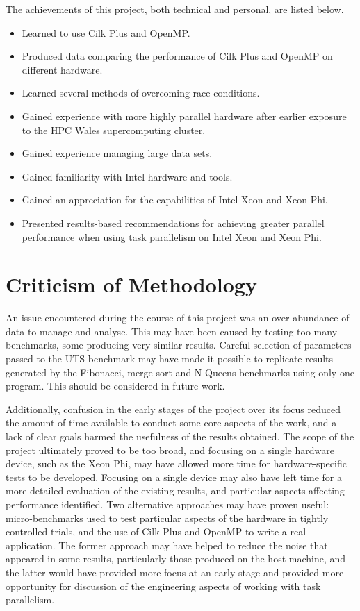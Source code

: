 \documentclass{report}
\begin{document}
The achievements of this project, both technical and personal, are listed below.
\begin{itemize}
	\item Learned to use Cilk Plus and OpenMP.
	\item Produced data comparing the performance of Cilk Plus and OpenMP on different hardware.
	\item Learned several methods of overcoming race conditions.
	\item Gained experience with more highly parallel hardware after earlier exposure to the HPC Wales supercomputing cluster.
	\item Gained experience managing large data sets.
	\item Gained familiarity with Intel hardware and tools.
	\item Gained an appreciation for the capabilities of Intel Xeon and Xeon Phi.
	\item Presented results-based recommendations for achieving greater parallel performance when using task parallelism on Intel Xeon and Xeon Phi.
\end{itemize}

\section{Criticism of Methodology}

An issue encountered during the course of this project was an over-abundance of data to manage and analyse. This may have been caused by testing too many benchmarks, some producing very similar results. Careful selection of parameters passed to the UTS benchmark may have made it possible to replicate results generated by the Fibonacci, merge sort and N-Queens benchmarks using only one program. This should be considered in future work.

Additionally, confusion in the early stages of the project over its focus reduced the amount of time available to conduct some core aspects of the work, and a lack of clear goals harmed the usefulness of the results obtained. The scope of the project ultimately proved to be too broad, and focusing on a single hardware device, such as the Xeon Phi, may have allowed more time for hardware-specific tests to be developed. Focusing on a single device may also have left time for a more detailed evaluation of the existing results, and particular aspects affecting performance identified. Two alternative approaches may have proven useful: micro-benchmarks used to test particular aspects of the hardware in tightly controlled trials, and the use of Cilk Plus and OpenMP to write a real application. The former approach may have helped to reduce the noise that appeared in some results, particularly those produced on the host machine, and the latter would have provided more focus at an early stage and provided more opportunity for discussion of the engineering aspects of working with task parallelism.
\end{document}
